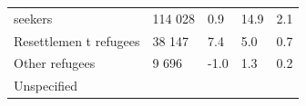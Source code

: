 \documentclass[
]{article}
\begin{document}
\begin{longtable}[]{@{}lllll@{}}
\begin{minipage}[t]{0.17\columnwidth}
seekers\strut
\end{minipage} & \begin{minipage}[t]{0.17\columnwidth}\raggedright
114 028\strut
\end{minipage} & \begin{minipage}[t]{0.17\columnwidth}\raggedright
0.9\strut
\end{minipage} & \begin{minipage}[t]{0.17\columnwidth}\raggedright
14.9\strut
\end{minipage} & \begin{minipage}[t]{0.17\columnwidth}\raggedright
2.1\strut
\end{minipage}\tabularnewline
\begin{minipage}[t]{0.17\columnwidth}\raggedright
Resettlemen
t
refugees\strut
\end{minipage} & \begin{minipage}[t]{0.17\columnwidth}\raggedright
38 147\strut
\end{minipage} & \begin{minipage}[t]{0.17\columnwidth}\raggedright
7.4\strut
\end{minipage} & \begin{minipage}[t]{0.17\columnwidth}\raggedright
5.0\strut
\end{minipage} & \begin{minipage}[t]{0.17\columnwidth}\raggedright
0.7\strut
\end{minipage}\tabularnewline
\begin{minipage}[t]{0.17\columnwidth}\raggedright
Other
refugees\strut
\end{minipage} & \begin{minipage}[t]{0.17\columnwidth}\raggedright
9 696\strut
\end{minipage} & \begin{minipage}[t]{0.17\columnwidth}\raggedright
-1.0\strut
\end{minipage} & \begin{minipage}[t]{0.17\columnwidth}\raggedright
1.3\strut
\end{minipage} & \begin{minipage}[t]{0.17\columnwidth}\raggedright
0.2\strut
\end{minipage}\tabularnewline
\begin{minipage}[t]{0.17\columnwidth}\raggedright
Unspecified\strut
\end{minipage} & \begin{minipage}[t]{0.17\columnwidth}\raggedright

\end{minipage}
\end{longtable}
\end{document}
